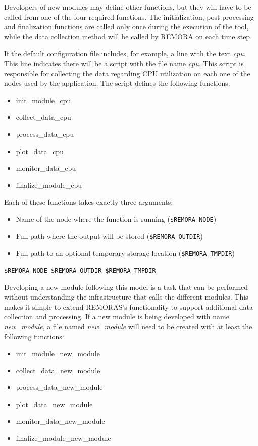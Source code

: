 \documentclass[10pt,a4paper]{report}
\begin{document}
Developers of new modules may define other functions,
but they will have to be called from one of the four required functions. The initialization,
post-processing and finalization functions are called only once during the execution of the
tool, while the data collection method will be called by REMORA on each time step.

If the default configuration file includes, for example, a line with the text \textit{cpu}.
This line indicates there will be a script with the file name \textit{cpu}. This script
is responsible for collecting the data regarding CPU utilization on each one of the
nodes used by the application. The script defines the following functions:

\begin{itemize}
	\item init\_module\_cpu
	\item collect\_data\_cpu
	\item process\_data\_cpu
	\item plot\_data\_cpu
	\item monitor\_data\_cpu
	\item finalize\_module\_cpu
\end{itemize}

Each of these functions takes exactly three arguments: 

\begin{itemize}
\item Name of the node where the function is running (\texttt{\$REMORA\_NODE})
\item Full path where the output will be stored (\texttt{\$REMORA\_OUTDIR})
\item Full path to an optional temporary storage location (\texttt{\$REMORA\_TMPDIR})
\end{itemize}

\verb+$REMORA_NODE $REMORA_OUTDIR $REMORA_TMPDIR+

Developing a new module following this model is a task that can be performed without understanding 
the infrastructure that calls the different modules.
This makes it simple to extend REMORAS's functionality to
support additional data collection and processing. If a new module is being developed with 
name \textit{new\_module}, a file named \textit{new\_module} will need to be created with at 
least the following functions:

\begin{itemize}
	\item init\_module\_new\_module
	\item collect\_data\_new\_module
	\item process\_data\_new\_module
	\item plot\_data\_new\_module
	\item monitor\_data\_new\_module
	\item finalize\_module\_new\_module
\end{itemize}
\end{document}
